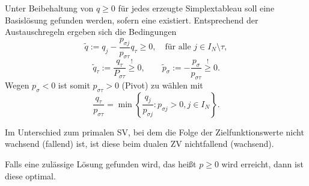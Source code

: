 Unter Beibehaltung von $q \ge 0$ für jedes erzeugte Simplextableau soll eine
Basislösung gefunden werden, sofern eine existiert. Entsprechend der
Austauschregeln ergeben sich die Bedingungen
\[ \tilde{q} := q_j - \frac{p_{\sigma j}}{p_{\sigma \tau}} q_\tau \ge 0, \quad
  \text{für alle } j \in I_N \setminus {\tau}, \]
\[ \tilde{q}_\tau := \frac{q_\tau}{P_{\sigma \tau}} \overset{!}{\ge} 0, \qquad
  \tilde{p}_\sigma := - \frac{p_\sigma}{p_{\sigma \tau}} \overset{!}{\ge} 0. \]
Wegen $p_\sigma < 0$ ist somit $p_{\sigma \tau} > 0$ (Pivot) zu wählen mit
\[ \frac{q_{\tau}}{p_{\sigma \tau}} = \min \left\{ \frac{q_j}{p_{\sigma j}} :
    p_{\sigma j} > 0, j \in I_N \right\}. \]

\begin{rmrk}
  Im Unterschied zum primalen SV, bei dem die Folge der Zielfunktionswerte nicht
  wachsend (fallend) ist, ist diese beim dualen ZV nichtfallend (wachsend).
\end{rmrk}

\begin{rmrk}
  Falls eine zulässige Lösung gefunden wird, das heißt $p \ge 0$ wird erreicht,
  dann ist diese optimal.
\end{rmrk}

